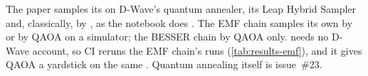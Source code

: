 The paper samples its  on D-Wave's quantum annealer, its Leap Hybrid Sampler and, classically, by
 \cite[§5.4]{Paper}, as the notebook does \cite[cells 15--17]{Notebook}. The EMF chain
samples its own  by  or by QAOA on a simulator; the BESSER chain by QAOA only.
 needs no D-Wave account, so CI reruns the EMF chain's runs (\cref{tab:results-emf}), and
it gives QAOA a yardstick on the same . Quantum annealing
itself is issue~\#23.
